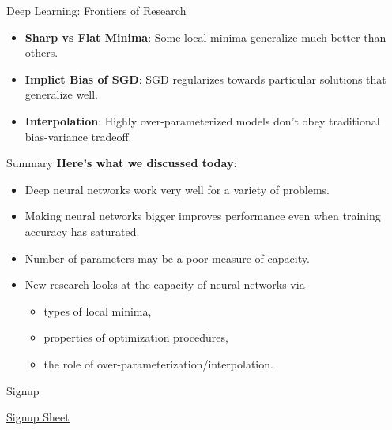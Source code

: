 \documentclass[notheorems]{beamer}
\begin{document}
\begin{frame}{Deep Learning: Frontiers of Research}
        \begin{itemize}
            \item \textbf{Sharp vs Flat Minima}: Some local minima generalize much better than others.
            \item \textbf{Implict Bias of SGD}: SGD regularizes towards particular solutions that generalize well.
            \item \textbf{Interpolation}: Highly over-parameterized models don't obey traditional bias-variance tradeoff.
        \end{itemize}

    \end{frame}

    \begin{frame}{Summary}
        \textbf{\Large Here's what we discussed today}:\\

        \begin{itemize}
            \large
            \item Deep neural networks work very well for a variety of problems.
            \item Making neural networks bigger improves performance even when training accuracy has saturated.
            \item Number of parameters may be a poor measure of capacity.
            \item New research looks at the capacity of neural networks via
            \begin{itemize}\large
                \item types of local minima,
                \item properties of optimization procedures,
                \item the role of over-parameterization/interpolation.
            \end{itemize}
        \end{itemize}

    \end{frame}

    \begin{frame}{Signup}

        \begin{center}
            {\Huge \color{blue} \underline{\href{https://tinyurl.com/y4pn846v}{Signup Sheet}}}
        \end{center}

    \end{frame}
\end{document}
